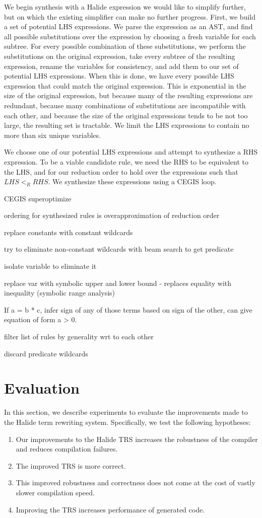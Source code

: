 \documentclass[sigplan,review,anonymous]{acmart}\settopmatter{printfolios=true,printccs=false,printacmref=false}
\begin{document}
We begin synthesis with a Halide expression we would like to simplify further, but on which the existing simplifier can make no further progress. First, we build a set of potential LHS expressions. We parse the expression as an AST, and find all possible substitutions over the expression by choosing a fresh variable for each subtree. For every possible combination of these substitutions, we perform the substitutions on the original expression, take every subtree of the resulting expression, rename the variables for consistency, and add them to our set of potential LHS expressions. When this is done, we have every possible LHS expression that could match the original expression. This is exponential in the size of the original expression, but because many of the resulting expressions are redundant, because many combinations of substitutions are incompatible with each other, and because the size of the original expressions tends to be not too large, the resulting set is tractable. We limit the LHS expressions to contain no more than six unique variables.

We choose one of our potential LHS expressions and attempt to synthesize a RHS expression. To be a viable candidate rule, we need the RHS to be equivalent to the LHS, and for our reduction order to hold over the expressions such that $LHS <_R RHS$. We synthesize these expressions using a CEGIS loop.

CEGIS superoptimize

ordering for synthesized rules is overapproximation of reduction order

replace constants with constant wildcards

try to eliminate non-constant wildcards with beam search to get predicate

isolate variable to eliminate it

replace var with symbolic upper and lower bound - replaces equality with inequality (symbolic range analysis)

If a = b * c, infer sign of any of those terms based on sign of the other, can give equation of form a > 0.

filter list of rules by generality wrt to each other

discard predicate wildcards

\section{Evaluation}
In this section, we describe experiments to evaluate the improvements made to the Halide term rewriting system.  Specifically, we
test the following hypotheses:
\begin{enumerate}
\item Our improvements to the Halide TRS increases the robustness of the compiler and reduces compilation failures.
\item The improved TRS is more correct.
\item This improved robustness and correctness does not come at the cost of vastly slower compilation speed.
\item Improving the TRS increases performance of generated code.
\end{enumerate}
\end{document}
